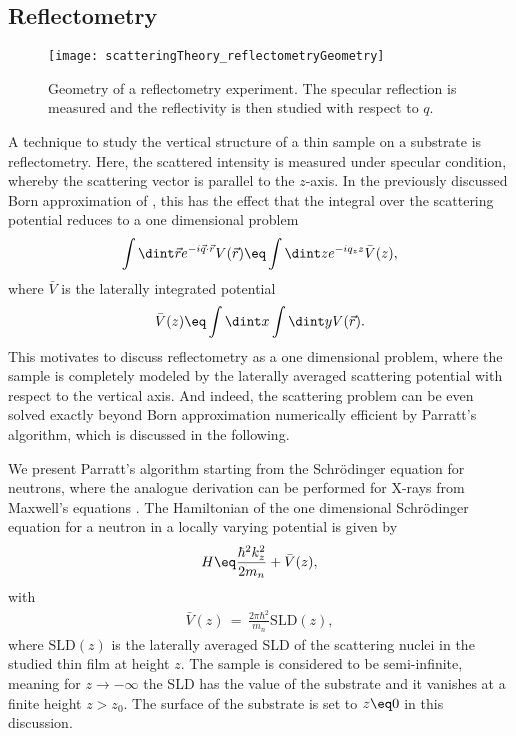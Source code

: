 \documentclass[\main/dresen_thesis.tex]{subfiles}
\begin{document}
  \subsection{Reflectometry}
    \label{sec:theoreticalBackground:scattering:reflectometry}
    \label{ch:appendix:numericalMethods:parrat}
    \begin{figure}
      \centering
      \texttt{[image: scatteringTheory\_reflectometryGeometry]}
      \caption{\label{fig:theoreticalBackground:scattering:reflectometry:geometry}Geometry of a reflectometry experiment. The specular reflection  is measured and the reflectivity is then studied with respect to $q$.}
    \end{figure}
    A technique to study the vertical structure of a thin sample on a substrate is reflectometry.
    Here, the scattered intensity is measured under specular condition, whereby the scattering vector is parallel to the $\mathit{z}$-axis.
    In the previously discussed Born approximation of , this has the effect that the integral over the scattering potential reduces to a one dimensional problem
    \begin{align}
      \int \dint \vec{r} e^{-i\vec{q} \cdot \vec{r}} V (\vec{r}) \eq \int \dint z e^{-i q_z z} \bar{V} (z),
    \end{align}
    where $\bar{V}$ is the laterally integrated potential
    \begin{align}
      \bar{V}(z) \eq \int \dint x \int \dint y V(\vec{r}).
    \end{align}
    This motivates to discuss reflectometry as a one dimensional problem, where the sample is completely modeled by the laterally averaged scattering potential with respect to the vertical axis.
    And indeed, the scattering problem can be even solved exactly beyond Born approximation numerically efficient by Parratt's algorithm, which is discussed in the following.

    We present Parratt's algorithm starting from the Schr\"odinger equation for neutrons, where the analogue derivation can be performed for X-rays from Maxwell's equations \cite{Daillant_1999_Xraya}.
    The Hamiltonian of the one dimensional Schr\"odinger equation for a neutron in a locally varying potential is given by
    \begin{align}
      H \eq \frac{\hbar^2 k_z^2}{2m_n} + \bar{V}(z),
    \end{align}
    with
    \begin{align}
      \bar{V}(z) \, = \, \frac{2 \pi \hbar^2}{m_n} \mathrm{SLD}(z),
    \end{align}
    where $\mathrm{SLD}(z)$ is the laterally averaged SLD of the scattering nuclei in the studied thin film at height $z$.
    The sample is considered to be semi-infinite, meaning for $z \rightarrow -\infty$ the SLD has the value of the substrate and it vanishes at a finite height $z > z_0$.
    The surface of the substrate is set to $z \eq 0$ in this discussion.
\end{document}
